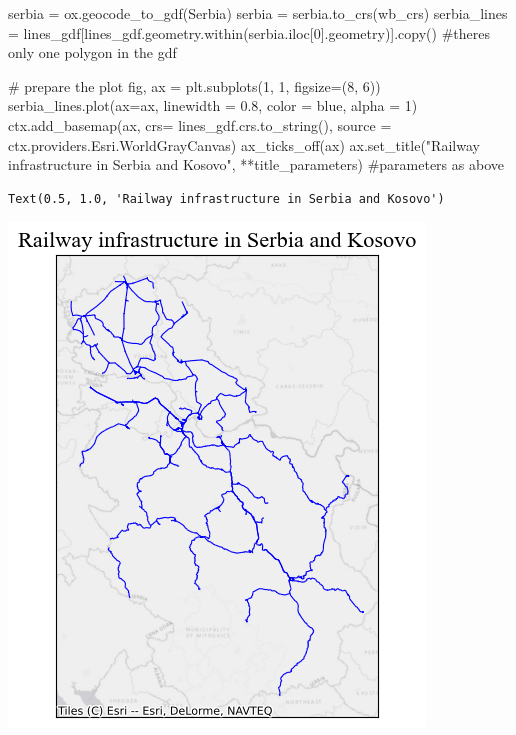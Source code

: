\documentclass[
  letterpaper,
  DIV=11,
  numbers=noendperiod]{scrreprt}
\newenvironment{Shaded}{\begin{snugshade}}{\end{snugshade}}
\newcommand{\CommentTok}[1]{\textcolor[rgb]{0.37,0.37,0.37}{#1}}
\newcommand{\DecValTok}[1]{\textcolor[rgb]{0.68,0.00,0.00}{#1}}
\newcommand{\FloatTok}[1]{\textcolor[rgb]{0.68,0.00,0.00}{#1}}
\newcommand{\NormalTok}[1]{\textcolor[rgb]{0.00,0.23,0.31}{#1}}
\newcommand{\OperatorTok}[1]{\textcolor[rgb]{0.37,0.37,0.37}{#1}}
\newcommand{\StringTok}[1]{\textcolor[rgb]{0.13,0.47,0.30}{#1}}
\begin{document}
\begin{Shaded}
\begin{Highlighting}[]
\NormalTok{serbia }\OperatorTok{=}\NormalTok{ ox.geocode\_to\_gdf(}\StringTok{\textquotesingle{}Serbia\textquotesingle{}}\NormalTok{)}
\NormalTok{serbia }\OperatorTok{=}\NormalTok{ serbia.to\_crs(wb\_crs)}
\NormalTok{serbia\_lines }\OperatorTok{=}\NormalTok{ lines\_gdf[lines\_gdf.geometry.within(serbia.iloc[}\DecValTok{0}\NormalTok{].geometry)].copy() }\CommentTok{\#there\textquotesingle{}s only one polygon in the gdf}
\end{Highlighting}
\end{Shaded}

\begin{Shaded}
\begin{Highlighting}[]
\CommentTok{\# prepare the plot}
\NormalTok{fig, ax }\OperatorTok{=}\NormalTok{ plt.subplots(}\DecValTok{1}\NormalTok{, }\DecValTok{1}\NormalTok{, figsize}\OperatorTok{=}\NormalTok{(}\DecValTok{8}\NormalTok{, }\DecValTok{6}\NormalTok{))}
\NormalTok{serbia\_lines.plot(ax}\OperatorTok{=}\NormalTok{ax, linewidth }\OperatorTok{=} \FloatTok{0.8}\NormalTok{, color }\OperatorTok{=} \StringTok{\textquotesingle{}blue\textquotesingle{}}\NormalTok{, alpha }\OperatorTok{=} \DecValTok{1}\NormalTok{)}
\NormalTok{ctx.add\_basemap(ax, crs}\OperatorTok{=}\NormalTok{ lines\_gdf.crs.to\_string(), source }\OperatorTok{=}\NormalTok{ ctx.providers.Esri.WorldGrayCanvas)}
\NormalTok{ax\_ticks\_off(ax)}
\NormalTok{ax.set\_title(}\StringTok{"Railway infrastructure in Serbia and Kosovo"}\NormalTok{, }\OperatorTok{**}\NormalTok{title\_parameters) }\CommentTok{\#parameters as above}
\end{Highlighting}
\end{Shaded}

\begin{verbatim}
Text(0.5, 1.0, 'Railway infrastructure in Serbia and Kosovo')
\end{verbatim}

\includegraphics{labs/w02_maps_files/figure-pdf/cell-13-output-2.png}
\end{document}
